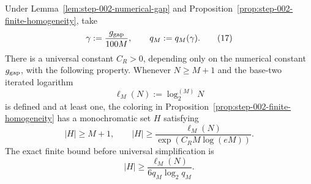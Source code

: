 \begin{proposition}
\label{prop:step-002-ramsey-extraction}

Under Lemma~\ref{lem:step-002-numerical-gap} and Proposition~\ref{prop:step-002-finite-homogeneity}, take
\[
\gamma:=\frac{g_{\rm gap}}{100M},
\qquad
q_M:=q_M(\gamma).
\tag{17}\label{eq:step-002-17}
\]
There is a universal constant \(C_R>0\), depending only on the numerical constant \(g_{\rm gap}\), with the following property. Whenever \(N\ge M+1\) and the base-two iterated logarithm
\[
\ell_M(N):=\log_2^{(M)}N
\tag{18}\label{eq:step-002-18}
\]
is defined and at least one, the coloring in Proposition~\ref{prop:step-002-finite-homogeneity} has a monochromatic set \(H\) satisfying
\[
|H|\ge M+1,
\qquad
|H|\ge
\frac{\ell_M(N)}{\exp(C_R M\log(eM))}.
\tag{19}\label{eq:step-002-19}
\]
The exact finite bound before universal simplification is
\[
|H|\ge
\frac{\ell_M(N)}{6q_M\log_2 q_M}.
\tag{20}\label{eq:step-002-20}
\]

\end{proposition}

